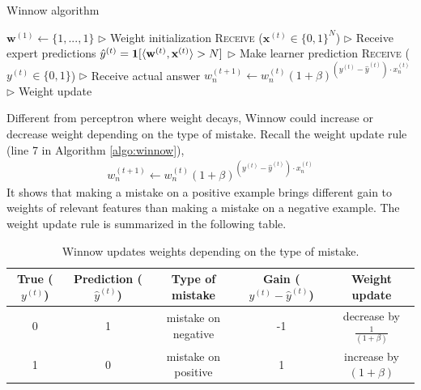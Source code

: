 \documentclass[11pt]{article}
\begin{document}
\begin{algorithm}[H]
\caption{Winnow algorithm}
\label{algo:perceptron}
\begin{algorithmic}[1]
\STATE $\textbf{w}^{(1)} \leftarrow \{1,...,1\}$ \hfill $\triangleright$ Weight initialization
\STATE \textsc{Receive} ($\textbf{x}^{(t)} \in\{0, 1\}^N$) \hfill $\triangleright$ Receive expert predictions
\STATE $\hat{y}^{(t)} = \textbf{1}[\langle \textbf w^{(t)}, \textbf x^{(t)}\rangle>N]$ \hfill $\triangleright$ Make learner prediction
\STATE \textsc{Receive} ($y^{(t)}\in\{0, 1\}$) \hfill $\triangleright$ Receive actual answer
\STATE $w_n^{(t+1)}\leftarrow w_n^{(t)} (1+\beta)^{ (y^{(t)}-\hat{y}^{(t)})\cdot x_n^{(t)}} $ \hfill $\triangleright$ Weight update
\ENDFOR
\end{algorithmic}\label{algo:winnow}
\end{algorithm}

\normalfont
Different from perceptron where weight decays, Winnow could increase or decrease weight depending on the type of mistake. Recall the weight update rule (line 7 in Algorithm \ref{algo:winnow}),  
\begin{align}
w_n^{(t+1)}\leftarrow w_n^{(t)} (1+\beta)^{ (y^{(t)}-\hat{y}^{(t)})\cdot x_n^{(t)}} 
\end{align}
It shows that making a mistake on a positive example brings different gain to weights of relevant features than making a mistake on a negative example. The weight update rule is summarized in the following table. 
\begin{table}[!htbp]
\centering
\begin{tabular}{|c|c|c|c|c|}
\hline
True ($y^{(t)}$) & Prediction ($\hat{y}^{(t)}$) & Type of mistake     & Gain (${y}^{(t)}-\hat{y}^{(t)}$) & Weight update \\ \hline
0    & 1          & mistake on negative & -1   & decrease by $\frac{1}{(1+\beta)}$   \\ \hline
1    & 0          & mistake on positive & 1    & increase by  $(1+\beta)$ \\ \hline
\end{tabular}
\caption{\label{tab:Weight Update}Winnow updates weights depending on the type of mistake.}
\end{table}
\end{document}
